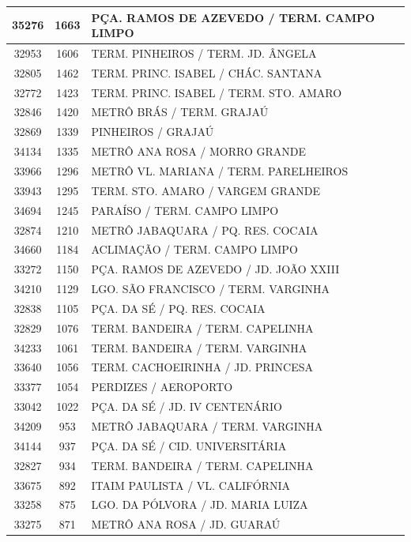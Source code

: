 \documentclass[
	12pt,				%
	oneside,			%
	a4paper,			%
	english,			%
	brazil				%
	]{abntex2ppgsi}
\begin{document}
\begin{apendicesenv}
\begin{longtable}{c|c|p{7cm}}
    35276 & 1663  & PÇA. RAMOS DE AZEVEDO / TERM. CAMPO LIMPO \\
\hline
    32953 & 1606  & TERM. PINHEIROS / TERM. JD. ÂNGELA \\
\hline
    32805 & 1462  & TERM. PRINC. ISABEL / CHÁC. SANTANA \\
\hline
    32772 & 1423  & TERM. PRINC. ISABEL / TERM. STO. AMARO \\
\hline
    32846 & 1420  & METRÔ BRÁS / TERM. GRAJAÚ \\
\hline
    32869 & 1339  & PINHEIROS / GRAJAÚ \\
\hline
    34134 & 1335  & METRÔ ANA ROSA / MORRO GRANDE \\
\hline
    33966 & 1296  & METRÔ VL. MARIANA / TERM. PARELHEIROS \\
\hline
    33943 & 1295  & TERM. STO. AMARO / VARGEM GRANDE \\
\hline
    34694 & 1245  & PARAÍSO / TERM. CAMPO LIMPO \\
\hline
    32874 & 1210  & METRÔ JABAQUARA / PQ. RES. COCAIA \\
\hline
    34660 & 1184  & ACLIMAÇÃO / TERM. CAMPO LIMPO \\
\hline
    33272 & 1150  & PÇA. RAMOS DE AZEVEDO / JD. JOÃO XXIII \\
\hline
    34210 & 1129  & LGO. SÃO FRANCISCO / TERM. VARGINHA \\
\hline
    32838 & 1105  & PÇA. DA SÉ / PQ. RES. COCAIA \\
\hline
    32829 & 1076  & TERM. BANDEIRA / TERM. CAPELINHA \\
\hline
    34233 & 1061  & TERM. BANDEIRA / TERM. VARGINHA \\
\hline
    33640 & 1056  & TERM. CACHOEIRINHA / JD. PRINCESA \\
\hline
    33377 & 1054  & PERDIZES / AEROPORTO \\
\hline
    33042 & 1022  & PÇA. DA SÉ / JD. IV CENTENÁRIO \\
\hline
    34209 & 953   & METRÔ JABAQUARA / TERM. VARGINHA \\
\hline
    34144 & 937   & PÇA. DA SÉ / CID. UNIVERSITÁRIA \\
\hline
    32827 & 934   & TERM. BANDEIRA / TERM. CAPELINHA \\
\hline
    33675 & 892   & ITAIM PAULISTA / VL. CALIFÓRNIA \\
\hline
    33258 & 875   & LGO. DA PÓLVORA / JD. MARIA LUIZA \\
\hline
    33275 & 871   & METRÔ ANA ROSA / JD. GUARAÚ \\

\end{longtable}
\end{apendicesenv}
\end{document}
